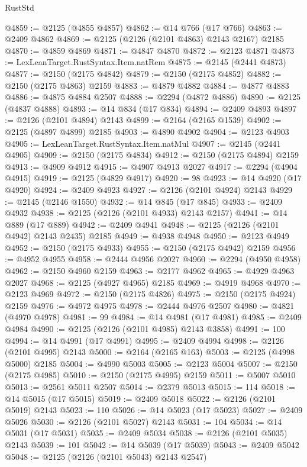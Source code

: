 \begin{lexlean}{RustStd}
\begin{coremodule}
@4859 := @2125 (@4855 @4857)
@4862 := @14 @766 (@17 @766)
@4863 := @2409 @4862
@4869 := @2125 (@2126 (@2101 @4863) @2143 @2167) @2185
@4870 := @4859 @4869
@4871 := @4847 @4870
@4872 := @2123 @4871
@4873 := LexLeanTarget.RustSyntax.Item.natRem
@4875 := @2145 (@2441 @4873)
@4877 := @2150 (@2175 @4842)
@4879 := @2150 (@2175 @4852)
@4882 := @2150 (@2175 @4863) @2159
@4883 := @4879 @4882
@4884 := @4877 @4883
@4886 := @4875 @4884 @2507
@4888 := @2294 (@4872 @4886)
@4890 := @2125 (@4837 @4888)
@4893 := @14 @834 (@17 @834)
@4894 := @2409 @4893
@4897 := @2126 (@2101 @4894) @2143
@4899 := @2164 (@2165 @1539)
@4902 := @2125 (@4897 @4899) @2185
@4903 := @4890 @4902
@4904 := @2123 @4903
@4905 := LexLeanTarget.RustSyntax.Item.natMul
@4907 := @2145 (@2441 @4905)
@4909 := @2150 (@2175 @4834)
@4912 := @2150 (@2175 @4894) @2159
@4913 := @4909 @4912
@4915 := @4907 @4913 @2027
@4917 := @2294 (@4904 @4915)
@4919 := @2125 (@4829 @4917)
@4920 := 98
@4923 := @14 @4920 (@17 @4920)
@4924 := @2409 @4923
@4927 := @2126 (@2101 @4924) @2143
@4929 := @2145 (@2146 @1550)
@4932 := @14 @845 (@17 @845)
@4933 := @2409 @4932
@4938 := @2125 (@2126 (@2101 @4933) @2143 @2157)
@4941 := @14 @889 (@17 @889)
@4942 := @2409 @4941
@4948 := @2125 (@2126 (@2101 @4942) @2143 @2435) @2185
@4949 := @4938 @4948
@4950 := @2123 @4949
@4952 := @2150 (@2175 @4933)
@4955 := @2150 (@2175 @4942) @2159
@4956 := @4952 @4955
@4958 := @2444 @4956 @2027
@4960 := @2294 (@4950 @4958)
@4962 := @2150 @4960 @2159
@4963 := @2177 @4962
@4965 := @4929 @4963 @2027
@4968 := @2125 (@4927 @4965) @2185
@4969 := @4919 @4968
@4970 := @2123 @4969
@4972 := @2150 (@2175 @4826)
@4975 := @2150 (@2175 @4924) @2159
@4976 := @4972 @4975
@4978 := @2444 @4976 @2507
@4980 := @4821 (@4970 @4978)
@4981 := 99
@4984 := @14 @4981 (@17 @4981)
@4985 := @2409 @4984
@4990 := @2125 (@2126 (@2101 @4985) @2143 @3858)
@4991 := 100
@4994 := @14 @4991 (@17 @4991)
@4995 := @2409 @4994
@4998 := @2126 (@2101 @4995) @2143
@5000 := @2164 (@2165 @163)
@5003 := @2125 (@4998 @5000) @2185
@5004 := @4990 @5003
@5005 := @2123 @5004
@5007 := @2150 (@2175 @4985)
@5010 := @2150 (@2175 @4995) @2159
@5011 := @5007 @5010
@5013 := @2561 @5011 @2507
@5014 := @2379 @5013
@5015 := 114
@5018 := @14 @5015 (@17 @5015)
@5019 := @2409 @5018
@5022 := @2126 (@2101 @5019) @2143
@5023 := 110
@5026 := @14 @5023 (@17 @5023)
@5027 := @2409 @5026
@5030 := @2126 (@2101 @5027) @2143
@5031 := 104
@5034 := @14 @5031 (@17 @5031)
@5035 := @2409 @5034
@5038 := @2126 (@2101 @5035) @2143
@5039 := 101
@5042 := @14 @5039 (@17 @5039)
@5043 := @2409 @5042
@5048 := @2125 (@2126 (@2101 @5043) @2143 @2547)

\end{coremodule}
\end{lexlean}
